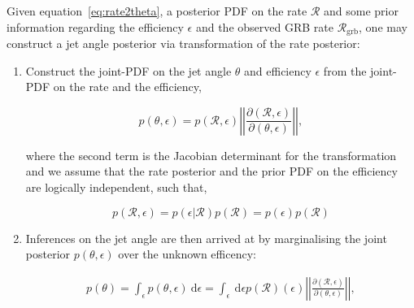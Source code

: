 \documentclass[a0,landscape]{a0poster}
\newcommand{\grbrate}{{{\mathcal R}_{\mathrm{grb}}}}
\newcommand{\cbcrate}{{{\mathcal R}}}
\newcommand{\diff}{{\mathrm d}}
\begin{document}
\begin{multicols}{4}
Given equation~\ref{eq:rate2theta}, a posterior PDF on the rate $\cbcrate$ and
some prior information regarding the efficiency $\epsilon$ and the observed GRB
rate $\grbrate$, one may construct a jet angle posterior via 
transformation of the rate posterior:
\begin{enumerate}
    \item Construct the joint-PDF on the jet angle $\theta$ and efficiency
        $\epsilon$ from the joint-PDF on the rate and the efficiency,

    \begin{equation}
    p(\theta,\epsilon) = p(\cbcrate,\epsilon)
    \left\lvert\left\lvert
    \frac{\partial(\cbcrate,\epsilon)}{\partial(\theta,\epsilon)}
    \right\rvert\right\rvert,
    \end{equation}

    where the second term is the Jacobian determinant for the transformation and
    we assume that the rate posterior and the prior PDF on the efficiency are
    logically independent, such that,

    \begin{equation}
        p(\cbcrate, \epsilon) =  p(\epsilon|\cbcrate)p(\cbcrate) =
        p(\epsilon)p(\cbcrate)
    \end{equation}

    \item Inferences on the jet angle are then arrived at by marginalising the joint
        posterior $p(\theta,\epsilon)$ over the unknown efficency:

        \begin{eqnarray}
        p(\theta) = \int_{\epsilon} p(\theta,\epsilon)~\diff \epsilon =
        \int_{\epsilon} ~\diff \epsilon p(\cbcrate)(\epsilon)
            \left\lvert\left\lvert
            \frac{\partial(\cbcrate,\epsilon)}{\partial(\theta,\epsilon)}
            \right\rvert\right\rvert,
        \end{eqnarray}

\end{enumerate}

\end{multicols}
\end{document}

